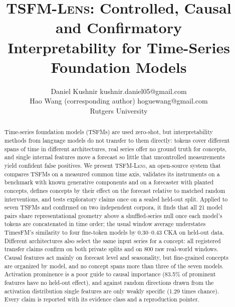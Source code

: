 \documentclass[twoside,11pt]{article}
\newcommand{\tool}{\textsc{TSFM-Lens}}
\begin{document}
\title{\tool: Controlled, Causal and Confirmatory\\ Interpretability for Time-Series Foundation Models}

\author{\name Daniel Kushnir \email kushnir.daniel05@gmail.com \\
       \name Hao Wang (corresponding author) \email hoguewang@gmail.com \\
       \addr Rutgers University}

\editor{}

\maketitle

\begin{abstract}%
Time-series foundation models (TSFMs) are used zero-shot, but interpretability methods from language models do not
transfer to them directly: tokens cover different spans of time in different architectures, real series offer no
ground truth for concepts, and single internal features move a forecast so little that uncontrolled measurements yield
confident false positives. We present \tool{}, an open-source system that compares TSFMs on a measured common time
axis, validates its instruments on a benchmark with known generative components and on a forecaster with planted
concepts, defines concepts by their effect on the forecast relative to matched random interventions, and tests
exploratory claims once on a sealed held-out split. Applied to seven TSFMs and confirmed on two independent corpora, it
finds that all 21 model pairs share representational geometry above a shuffled-series null once each model's tokens are
concatenated in time order; the usual window average understates TimesFM's similarity to four fine-token models by
0.30--0.43 CKA on held-out data. Different architectures also select the same input series for a concept: all
registered transfer claims confirm on both private splits and on 800 raw real-world windows. Causal features act mainly
on forecast level and seasonality, but fine-grained concepts are organized by model, and no concept spans more than
three of the seven models. Activation prominence is a poor guide to causal importance (83.5\% of prominent features
have no held-out effect), and against random directions drawn from the activation distribution single features are
only weakly specific (1.29 times chance). Every claim is reported with its evidence class and a reproduction pointer.
\end{abstract}
\end{document}
